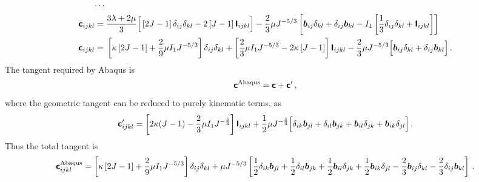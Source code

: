 \documentclass[10pt,letterpaper,oneside]{report}
\newcommand{\ten}[1]{\mbox{\boldmath $#1$}{}}
\newcommand{\tenf}[1]{\mbox{{\sffamily{\bfseries {#1}}}}}
\newcommand{\scas}[1]{\mbox{{\scriptsize{${\rm{#1}}$}}}{}}
\begin{document}
\begin{itemize}
\begin{align}
\cdots{}& \notag \\
\tenf{c}_{ijkl} ={}& \frac{3 \lambda + 2 \mu}{3} \Big[ \left[ 2J - 1 \right] \delta_{ij} \delta_{kl} - 2 \left[ J - 1 \right] \tenf{I}_{ijkl} \Big] - \frac{2}{3} \mu J^{-5/3} \left[ \ten{b}_{ij} \delta_{kl} + \delta_{ij} \ten{b}_{kl} - I_1 \left[ \frac{1}{3} \delta_{ij} \delta_{kl} + \tenf{I}_{ijkl} \right] \right]  
\\
\tenf{c}_{ijkl} ={}& \left[ \kappa \left[ 2J - 1 \right] + \frac{2}{9} \mu I_1 J^{-5/3} \right] \delta_{ij} \delta_{kl} + \left[ \frac{2}{3} \mu I_1 J^{-5/3}  - 2 \kappa \left[ J - 1 \right] \right] \tenf{I}_{ijkl} - \frac{2}{3} \mu J^{-5/3} \Big[ \ten{b}_{ij} \delta_{kl} + \delta_{ij} \ten{b}_{kl} \Big] \, . 
\end{align}
The tangent required by Abaqus is
\begin{equation}
\tenf{c}^{\scas{Abaqus}} = \tenf{c} + \tenf{c}' \, , 
\end{equation}
where the geometric tangent can be reduced to purely kinematic terms, as 
\begin{equation}
\tenf{c}'_{ijkl} = \left[ 2 \kappa (J-1) - \frac{2}{3} \mu I_1 J^{- \frac{5}{3} } \right] \tenf{I}_{ijkl} + \frac{1}{2}\mu J^{- \frac{5}{3} } \Big[ \delta_{ik} \ten{b}_{jl} + \delta_{il} \ten{b}_{jk} + \ten{b}_{il} \delta_{jk} + \ten{b}_{ik} \delta_{jl} \Big] \, . 
\end{equation}
Thus the total tangent is
\begin{equation}
\tenf{c}^{\scas{Abaqus}}_{ijkl} = \left[ \kappa \left[ 2J - 1 \right] + \frac{2}{9} \mu I_1 J^{-5/3} \right] \delta_{ij} \delta_{kl} +\mu J^{-5/3} \left[ \frac{1}{2} \delta_{ik} \ten{b}_{jl} + \frac{1}{2} \delta_{il} \ten{b}_{jk} + \frac{1}{2} \ten{b}_{il} \delta_{jk} + \frac{1}{2} \ten{b}_{ik} \delta_{jl} - \frac{2}{3} \ten{b}_{ij} \delta_{kl} - \frac{2}{3} \delta_{ij} \ten{b}_{kl} \right] \, . 
\end{equation}



\end{itemize}
\end{document}
